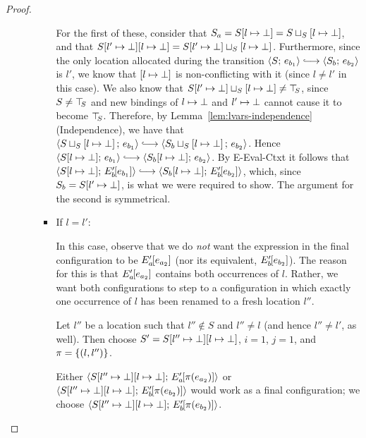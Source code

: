 \begin{proof}
\begin{enumerate}
\begin{enumerate}
\begin{itemize}
          For the first of these, consider that $S_a =
          S[l \mapsto \bot] =
          S \sqcup_{S} \left[ l \mapsto \bot \right]$, and that
          $S[l' \mapsto \bot][l \mapsto \bot] =
          S[l' \mapsto \bot] \sqcup_{S} \left[ l \mapsto \bot \right]$.
          Furthermore, since the only location allocated during the
          transition $\config{S}{e_{b_1}} \parstepsto
          \config{S_b}{e_{b_2}}$ is $l'$, we know that
          $\left[ l \mapsto \bot \right]$ is non-conflicting with
          it (since $l \neq l'$ in this case).  We also know that
          $S[l' \mapsto \bot] \sqcup_{S} \left[ l \mapsto \bot \right]
          \neq \top\hspace{-0.85mm}_{S}$, since $S \neq \top\hspace{-0.85mm}_{S}$ and new bindings of
          $l \mapsto \bot$ and $l' \mapsto \bot$
          cannot cause it to become $\top\hspace{-0.85mm}_{S}$.  Therefore, by
          Lemma~\ref{lem:lvars-independence} (Independence), we have
          that
          $\config{\lubstore{S}{\store{\storebindingRaw{l}{\bot}}}}{e_{b_1}}
          \parstepsto
          \config{\lubstore{S_b}{\store{\storebindingRaw{l}{\bot}}}}{e_{b_2}}$.
          Hence $\config{\extSRaw{S}{l}{\bot}}{e_{b_1}} \parstepsto
          \config{\extSRaw{S_b}{l}{\bot}}{e_{b_2}}$.  By {\sc
            E-Eval-Ctxt} it follows that
          $\config{\extSRaw{S}{l}{\bot}}{\evalctxt{E'_b}{e_{b_1}}}
          \parstepsto
          \config{\extSRaw{S_b}{l}{\bot}}{\evalctxt{E'_b}{e_{b_2}}}$,
          which, since $S_b = S[l' \mapsto \bot]$, is what we were
          required to show.  The argument for the second is
          symmetrical.

        \item If $l = l'$:

          In this case, observe that we do \emph{not} want the
          expression in the final configuration to be
          $E'_a\hspace{-1mm}\left[e_{a_2}\right]$ (nor its equivalent,
          $E'_b\hspace{-1mm}\left[e_{b_2}\right]$).  The reason for this is that
          $E'_a\hspace{-1mm}\left[e_{a_2}\right]$ contains both occurrences of $l$.
          Rather, we want both configurations to step to a
          configuration in which exactly one occurrence of $l$ has
          been renamed to a fresh location $l''$.

          Let $l''$ be a location such that $l'' \notin S$ and $l''
          \neq l$ (and hence $l'' \neq l'$, as well).  Then choose $S'
          = S[l'' \mapsto \bot][l \mapsto \bot]$, $i = 1$, $j =
          1$, and $\pi = \left\{(l, l'')\right\}$.

          Either
          $\langle S[l'' \mapsto \bot][l \mapsto \bot];\, E'_a\hspace{-1mm}\left[\pi(e_{a_2})\right] \rangle$
          or
          $\langle S[l'' \mapsto \bot][l \mapsto \bot];\, E'_b\hspace{-1mm}\left[\pi(e_{b_2})\right] \rangle$
          would work as a final configuration; we choose
          $\langle S[l'' \mapsto \bot][l \mapsto \bot];\, E'_b\hspace{-1mm}\left[\pi(e_{b_2})\right] \rangle$.


\end{itemize}
\end{enumerate}
\end{enumerate}
\end{proof}
